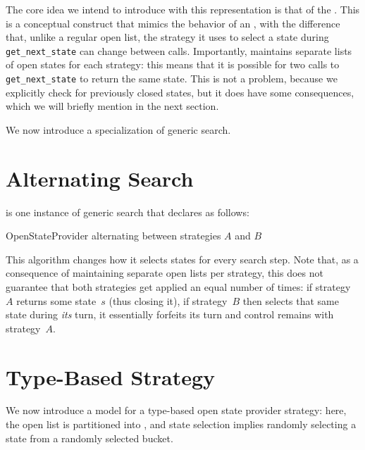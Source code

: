 The core idea we intend to introduce with this representation is that of the . This is a conceptual construct that mimics the behavior of an , with the difference that, unlike a regular open list, the strategy it uses to select a state during \texttt{get\_next\_state} can change between calls. Importantly,  maintains separate lists of open states for each strategy: this means that it is possible for two calls to \texttt{get\_next\_state} to return the same state. This is not a problem, because we explicitly check for previously closed states, but it does have some consequences, which we will briefly mention in the next section.

We now introduce a specialization of generic search.

\section{Alternating Search}

 is one instance of generic search that declares  as follows:

\begin{algorithmic}[1]
    \State {} \ceq \New OpenStateProvider alternating between strategies $A$ and $B$
\end{algorithmic}

This algorithm changes how it selects states for every search step. Note that, as a consequence of  maintaining separate open lists per strategy, this does not guarantee that both strategies get applied an equal number of times: if strategy~$A$ returns some state~$s$ (thus closing it), if strategy~$B$ then selects that same state during \textit{its} turn, it essentially forfeits its turn and control remains with strategy~$A$.


\section{Type-Based Strategy}

We now introduce a model for a type-based open state provider strategy: here, the open list is partitioned into , and state selection implies randomly selecting a state from a randomly selected bucket.

